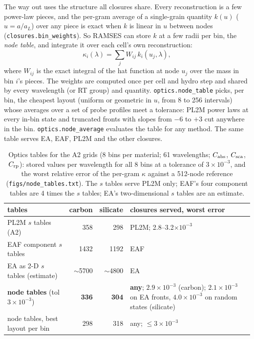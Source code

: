 \documentclass[11pt,a4paper]{article}
\begin{document}
The way out uses the structure all closures share. Every reconstruction is a few power-law pieces, and the per-gram
average of a single-grain quantity $k(u)$ ($u = a/a_L$) over any piece is exact when $k$ is linear in $u$ between nodes
(\texttt{closures.bin\_weights}). So RAMSES can store $k$ at a few radii per bin, the \emph{node table}, and integrate
it over each cell's own reconstruction:
\begin{equation}
\kappa_i(\lambda) = \sum_j W_{ij}\,k_i(u_j, \lambda),
\end{equation}
where $W_{ij}$ is the exact integral of the hat function at node $u_j$ over the mass in bin $i$'s pieces. The weights
are computed once per cell and hydro step and shared by every wavelength (or RT group) and quantity. \texttt{optics.node\_table} picks, per bin, the cheapest layout (uniform or geometric in $u$, from 8 to 256
intervals) whose averages over a set of probe profiles meet a tolerance: PL2M power laws at every in-bin state and
truncated fronts with slopes from $-6$ to $+3$ cut anywhere in the bin. \texttt{optics.node\_average} evaluates the
table for any method. The same table serves EA, EAF, PL2M and the other closures.

\begin{table}[H]
\centering\small
\caption{Optics tables for the A2 grids (8 bins per material; 61 wavelengths; $C_{\rm abs}$, $C_{\rm sca}$, $C_{\rm rp}$):
stored values per wavelength for all 8 bins at a tolerance of $3\times10^{-3}$, and the worst relative error of the
per-gram $\kappa$ against a 512-node reference (\texttt{figs/node\_tables.txt}). The $s$ tables serve PL2M only; EAF's
four component tables are 4 times the $s$ tables; EA's two-dimensional $s$ tables are an estimate.}\label{tab:nodetab}
\begin{tabularx}{\textwidth}{@{}l r r L@{}}
\toprule
tables & carbon & silicate & closures served, worst error \\
\midrule
PL2M $s$ tables (A2) & 358 & 298 & PL2M; 2.8--3.2$\times10^{-3}$ \\
EAF component $s$ tables & 1432 & 1192 & EAF \\
EA as 2-D $s$ tables (estimate) & $\sim$5700 & $\sim$4800 & EA \\
\textbf{node tables} (tol $3\times10^{-3}$) & \textbf{336} & \textbf{304} & \textbf{any}; $2.9\times10^{-3}$ (carbon);
  $2.1\times10^{-3}$ on EA fronts, $4.0\times10^{-3}$ on random states (silicate) \\
node tables, best layout per bin & 298 & 318 & any; $\le3\times10^{-3}$ \\
\bottomrule
\end{tabularx}
\end{table}
\end{document}
